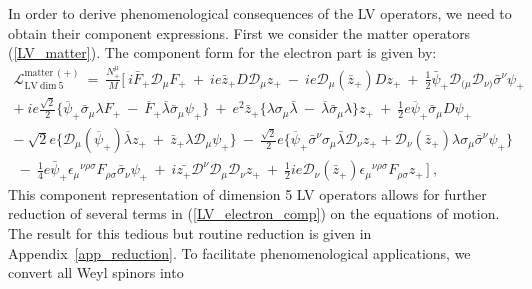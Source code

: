 \documentclass[12pt]{revtex4}
\begin{document}
In order to derive phenomenological consequences of 
the LV operators, we need to obtain their component expressions.
First we consider the matter operators (\ref{LV_matter}).
The component form for the electron part is given by: 
\begin{gather}
\nonumber
  \mathcal{L}_{\mathrm{LV~dim~5}}^{\mathrm{matter\,(+)}} 
~ =~ \frac{N_+^\mu}{M} \Big[~
    i \bar{F}_+ \mathcal{D}_\mu F_+ ~+~
    i e \bar{z}_+ D \mathcal{D}_\mu z_+ ~-~
    i e \mathcal{D}_\mu(\bar{z}_+) D z_+ 
~+~ 
  \frac{1}{2}\bar{\psi}_+\mathcal{D}_{(\mu}\mathcal{D}_{\nu)}
               \bar{\sigma}^\nu \psi_+ 
\nonumber \\
  + ~ 
    i e \frac{\sqrt{2}}{2} \Big\{
               \overline{\psi}_+\bar\sigma_\mu\lambda F_+ 
       ~-~
               \overline{F}_+\overline{\lambda} \bar\sigma_\mu \psi_+
                         \Big\}  ~+~
    e^2 \bar{z}_+ \Big\{
               \lambda\sigma_\mu\bar{\lambda} 
       ~-~
               \overline{\lambda}\bar\sigma_\mu\lambda 
                       \Big\} z_+ 
~+~ 
    \frac{1}{2} e \overline{\psi}_+\bar\sigma_\mu D\psi_+
\nonumber \\
\nonumber
 -~ 
   \sqrt{2} e \Big\{ 
                     \mathcal{D}_\mu(\overline{\psi}_+)\overline{\lambda} z_+ 
     ~+~ 
                     \bar{z}_+ \lambda \mathcal{D}_\mu \psi_+ 
                     \Big\} 
    ~-~ 
    \frac{\sqrt{2}}{2} e \Big\{ 
                      \overline{\psi}_+\bar\sigma^\nu\sigma_\mu 
                     \bar{\lambda}\mathcal{D}_\nu z_+ +
                     \mathcal{D}_\nu(\bar{z}_+)\lambda\sigma_\mu
                     \bar{\sigma}^\nu \psi_+
                     \Big\}
   \\
  ~ -~
  \frac{1}{4} e \bar{\psi}_+\epsilon_\mu{}^{\nu\rho\sigma}
              F_{\rho\sigma} \bar{\sigma}_\nu \psi_+
   ~+~
  i \bar{z_+} \mathcal{D}^\nu \mathcal{D}_\mu \mathcal{D}_\nu z_+ 
   ~+~
   \frac{1}{2} i e \mathcal{D}_\nu (\bar{z}_+) \epsilon_\mu{}^{\nu\rho\sigma}
              F_{\rho\sigma} z_+ \, 
   \Big] ~,
\label{LV_electron_comp}
\end{gather}
%
This component representation  of dimension 5 LV operators allows 
for further
reduction of several terms in (\ref{LV_electron_comp}) on the
equations of motion. The result for this tedious but routine reduction
is given in Appendix~\ref{app_reduction}. To facilitate
phenomenological applications, we convert all Weyl spinors into
\end{document}
